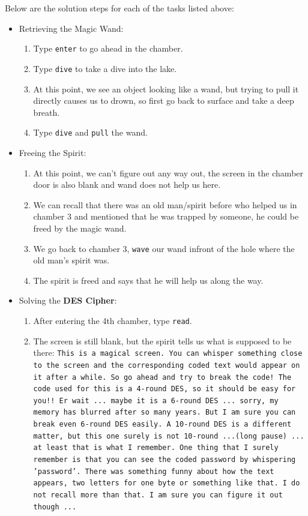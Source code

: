 \documentclass[10pt,twoside]{article}
\begin{document}
Below are the solution steps for each of the tasks listed above:
\begin{itemize}
  \setlength\itemsep{0em}
  \item Retrieving the Magic Wand:
    \begin{enumerate}
      \item Type \texttt{enter} to go ahead in the chamber.
      \item Type \texttt{dive} to take a dive into the lake.
      \item At this point, we see an object looking like a wand, but trying to pull it directly causes us to drown, so first go back to surface and take a deep breath.
      \item Type \texttt{dive} and \texttt{pull} the wand.
    \end{enumerate}
  \item Freeing the Spirit:
    \begin{enumerate}
        \item At this point, we can't figure out any way out, the screen in the chamber door is also blank and wand does not help us here.
        \item We can recall that there was an old man/spirit before who helped us in chamber 3 and mentioned that he was trapped by someone, he could be freed by the magic wand.
        \item We go back to chamber 3, \texttt{wave} our wand infront of the hole where the old man's spirit was.
        \item The spirit is freed and says that he will help us along the way.
    \end{enumerate}
  \item Solving the \textbf{DES Cipher}:
    \begin{enumerate}
      \item After entering the 4th chamber, type \texttt{read}.
        \item The screen is still blank, but the spirit tells us what is supposed to be there: \newline
          \texttt{This is a magical screen. You can whisper something close to the screen and the corresponding coded text would appear on it after a while. So go ahead and try to break the code! The code used for this is a 4-round DES, so it should be easy for you!! Er wait ... maybe it is a 6-round DES ... sorry, my memory has blurred after so many years. But I am sure you can break even 6-round DES easily. A 10-round DES is a different matter, but this one surely is not 10-round ...(long pause) ... at least that is what I remember. One thing that I surely remember is that you can see the coded password by whispering 'password'. There was something funny about how the text appears, two letters for one byte or something like that. I do not recall more than that. I am sure you can figure it out though ...}
    \end{enumerate}
\end{itemize}
\end{document}
